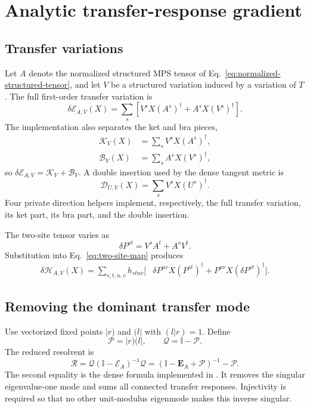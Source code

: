 \documentclass[11pt]{article}
\newcommand{\Id}{\mathbb{I}}
\newcommand{\E}{\mathcal{E}}
\newcommand{\Htwo}{\mathcal{H}}
\newcommand{\Res}{\mathcal{R}}
\newcommand{\Proj}{\mathcal{P}}
\newcommand{\Qproj}{\mathcal{Q}}
\newcommand{\code}[1]{\texttt{\detokenize{#1}}}
\begin{document}
\section{Analytic transfer-response gradient}
\label{sec:gradient}

\subsection{Transfer variations}

Let $A$ denote the normalized structured MPS tensor of
Eq.~\eqref{eq:normalized-structured-tensor}, and let $V$ be a structured
variation induced by a variation of $T$.  The full first-order transfer
variation is
\begin{equation}
  \delta\E_{A,V}(X)
  =\sum_s\left[
    V^sX(A^s)^\dagger+A^sX(V^s)^\dagger
  \right].
  \label{eq:transfer-variation}
\end{equation}
The implementation also separates the ket and bra pieces,
\begin{align}
  \mathcal K_V(X)&=\sum_sV^sX(A^s)^\dagger,
  \label{eq:ket-variation}\\
  \mathcal B_V(X)&=\sum_sA^sX(V^s)^\dagger,
  \label{eq:bra-variation}
\end{align}
so $\delta\E_{A,V}=\mathcal K_V+\mathcal B_V$.  A double insertion used by
the dense tangent metric is
\begin{equation}
  \mathcal D_{U,V}(X)=\sum_sV^sX(U^s)^\dagger.
  \label{eq:double-variation}
\end{equation}
Four private direction helpers implement, respectively, the full transfer
variation, its ket part, its bra part, and the double insertion.

The two-site tensor varies as
\begin{equation}
  \delta P^{st}=V^sA^t+A^sV^t.
  \label{eq:pair-variation}
\end{equation}
Substitution into Eq.~\eqref{eq:two-site-map} produces
\begin{align}
  \delta\Htwo_{A,V}(X)
  =\sum_{s,t,u,v}h_{stuv}\big[&
    \delta P^{uv}X(P^{st})^\dagger
    +P^{uv}X(\delta P^{st})^\dagger
  \big].
  \label{eq:two-site-variation}
\end{align}

\subsection{Removing the dominant transfer mode}

Use vectorized fixed points $|r)$ and $(l|$ with $(l|r)=1$.  Define
\begin{equation}
  \Proj=|r)(l|,
  \qquad
  \Qproj=\Id-\Proj.
  \label{eq:PQ}
\end{equation}
The reduced resolvent is
\begin{equation}
  \Res
  =\Qproj(\Id-\E_A)^{-1}\Qproj
  =(\Id-\bm E_A+\Proj)^{-1}-\Proj.
  \label{eq:reduced-resolvent}
\end{equation}
The second equality is the dense formula implemented in
\code{_reduced_resolvent}.  It removes the singular eigenvalue-one mode and
sums all connected transfer responses.  Injectivity is required so that no
other unit-modulus eigenmode makes this inverse singular.
\end{document}
